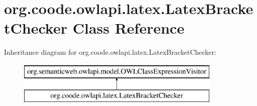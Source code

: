\hypertarget{classorg_1_1coode_1_1owlapi_1_1latex_1_1_latex_bracket_checker}{\section{org.\-coode.\-owlapi.\-latex.\-Latex\-Bracket\-Checker Class Reference}
\label{classorg_1_1coode_1_1owlapi_1_1latex_1_1_latex_bracket_checker}
}
Inheritance diagram for org.\-coode.\-owlapi.\-latex.\-Latex\-Bracket\-Checker\-:\begin{figure}[H]
\begin{center}
\leavevmode
\includegraphics[height=2.000000cm]{classorg_1_1coode_1_1owlapi_1_1latex_1_1_latex_bracket_checker}
\end{center}
\end{figure}
